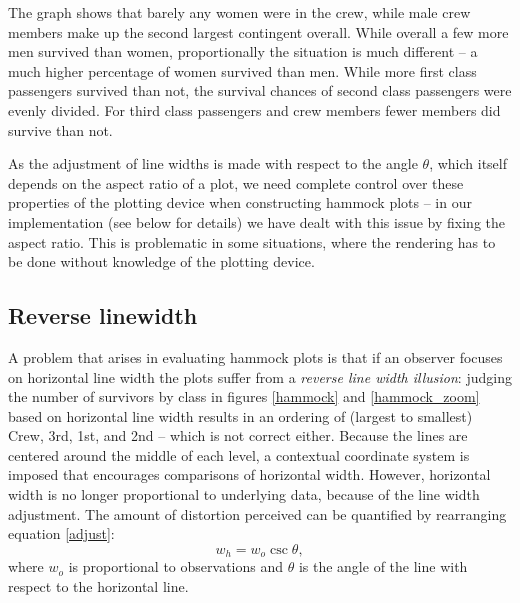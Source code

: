 \documentclass[journal]{vgtc}\usepackage{graphicx, color}
\begin{document}
The graph shows that barely any women were in the crew, while male crew members make up the second largest contingent overall. While overall a few more men survived than women, proportionally the situation is much different -- a much higher percentage of women survived than men. While more first class passengers survived than not, the  survival chances of second class passengers were evenly divided. For third class passengers and crew members fewer members did  survive than not. 

As the adjustment of line widths is made with respect to the angle $\theta$, which itself depends on the aspect ratio of a plot, we need complete control over these properties of the plotting device when constructing hammock plots  -- in our implementation (see below for details) we have dealt with this issue by fixing the aspect ratio. This is problematic in some situations, where the rendering has to be done without knowledge of the plotting device. 



\subsection{Reverse linewidth}
A problem that arises in evaluating hammock plots is that if an observer focuses on horizontal line width  the plots suffer from a {\it reverse line width illusion}:  judging the number of survivors by class in figures \ref{hammock} and \ref{hammock_zoom} based on horizontal line width  results in an ordering of (largest to smallest) Crew, 3rd, 1st, and 2nd -- which is not correct either. %
Because the lines are centered around the middle of each level, a contextual coordinate system is imposed that encourages comparisons of horizontal width. However, horizontal width is no longer proportional to underlying data, because of the line width adjustment.  
The amount of distortion perceived can be quantified by rearranging equation \ref{adjust}:
\begin{equation}\label{rev}
w_h = w_o \csc \theta,
\end{equation}
 where $w_o$ is proportional to observations and $\theta$ is the angle of the line with respect to the horizontal line.
\end{document}
